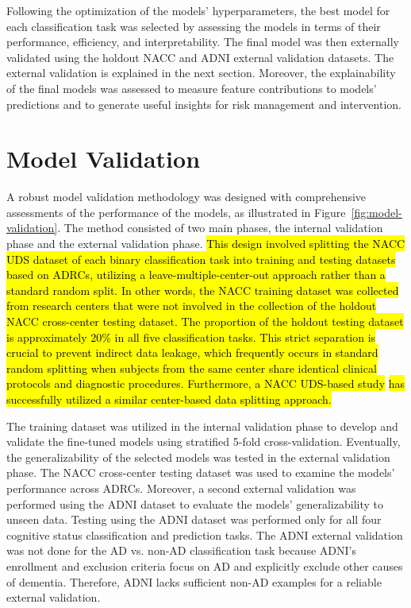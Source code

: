 Following the optimization of the models' hyperparameters, the best model for each classification task was selected by assessing the models in terms of their performance, efficiency, and interpretability. The final model was then externally validated using the holdout NACC and ADNI external validation datasets. The external validation is explained in the next section. Moreover, the explainability of the final models was assessed to measure feature contributions to models' predictions and to generate useful insights for risk management and intervention.

\section{Model Validation}
\label{sec:model-validation}
A robust model validation methodology was designed with comprehensive assessments of the performance of the models, as illustrated in Figure~\ref{fig:model-validation}. The method consisted of two main phases, the internal validation phase and the external validation phase. \hl{This design involved splitting the NACC UDS dataset of each binary classification task into training and testing datasets based on ADRCs, utilizing a leave-multiple-center-out approach rather than a standard random split. In other words, the NACC training dataset was collected from research centers that were not involved in the collection of the holdout NACC cross-center testing dataset. The proportion of the holdout testing dataset is approximately 20\% in all five classification tasks. This strict separation is crucial to prevent indirect data leakage, which frequently occurs in standard random splitting when subjects from the same center share identical clinical protocols and diagnostic procedures. Furthermore, a NACC UDS-based study} \cite{Phongpreecha2023Prediction} \hl{has successfully utilized a similar center-based data splitting approach.}

The training dataset was utilized in the internal validation phase to develop and validate the fine-tuned models using stratified 5-fold cross-validation. Eventually, the generalizability of the selected models was tested in the external validation phase. The NACC cross-center testing dataset was used to examine the models' performance across ADRCs. Moreover, a second external validation was performed using the ADNI dataset to evaluate the models' generalizability to unseen data. Testing using the ADNI dataset was performed only for all four cognitive status classification and prediction tasks. The ADNI external validation was not done for the AD vs. non-AD classification task because ADNI’s enrollment and exclusion criteria focus on AD and explicitly exclude other causes of dementia. Therefore, ADNI lacks sufficient non-AD examples for a reliable external validation.

